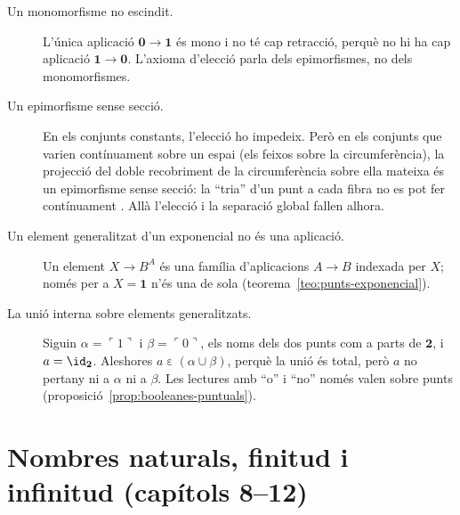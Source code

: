 \begin{description}
\item[Un monomorfisme no escindit.] L'única aplicació \(\mathbf0\to\mathbf1\)
és mono i no té cap retracció, perquè no hi ha cap aplicació
\(\mathbf1\to\mathbf0\). L'axioma d'elecció parla dels epimorfismes, no dels
monomorfismes.

\item[Un epimorfisme sense secció.] En els conjunts constants, l'elecció ho
impedeix. Però en els conjunts que varien contínuament sobre un espai (els
feixos sobre la circumferència), la projecció del doble recobriment de la
circumferència sobre ella mateixa és un epimorfisme sense secció: la
\enquote{tria} d'un punt a cada fibra no es pot fer contínuament
\cite[pàg.~14]{bell2006}. Allà l'elecció i la separació global fallen
alhora.

\item[Un element generalitzat d'un exponencial no és una aplicació.] Un
element \(X\to B^A\) és una família d'aplicacions \(A\to B\) indexada per
\(X\); només per a \(X=\mathbf1\) n'és una de sola
(teorema~\ref{teo:punts-exponencial}).

\item[La unió interna sobre elements generalitzats.] Siguin
\(\alpha=\ulcorner1\urcorner\) i \(\beta=\ulcorner0\urcorner\), els noms dels
dos punts com a parts de \(\mathbf2\), i \(a=\id_{\mathbf2}\). Aleshores
\(a\mathrel{\varepsilon}(\alpha\cup\beta)\), perquè la unió és total, però
\(a\) no pertany ni a \(\alpha\) ni a \(\beta\). Les lectures amb \enquote{o}
i \enquote{no} només valen sobre punts
(proposició~\ref{prop:booleanes-puntuals}).
\end{description}

\section*{Nombres naturals, finitud i infinitud (capítols 8--12)}

